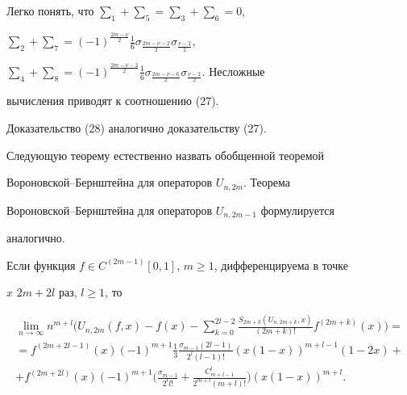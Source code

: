 \begin{pf}
Легко понять, что $\sum_1+\sum_5=\sum_3+\sum_6=0$, 


$\sum_2+\sum_7=(-1)^{\frac{2m-\nu}{2}}\frac{1}{6} 


\sigma_{\frac{2m-\nu-2}{2}}\sigma_{\frac{\nu-2}{2}}$, 


$\sum_4+\sum_8=(-1)^{\frac{2m-\nu-2}{2}}\frac{1}{6} 


\sigma_{\frac{2m-\nu-6}{2}}\sigma_{\frac{\nu-2}{2}}$. Несложные 


вычисления приводят к соотношению (27). 


 


Доказательство (28) аналогично доказательству (27). 


\end{pf} 


 


Следующую теорему естественно назвать обобщенной теоремой 


Вороновской--Бернштейна для операторов $U_{n,2m}$. Теорема 


Вороновской--Бернштейна для операторов $U_{n,2m-1}$ формулируется 


аналогично. 


 


\begin{thm} 


Если функция $f\in C^{(2m-1)}[0,1]$, $m\ge1$, дифференцируема в точке 


$x$\; $2m+2l$ раз, $l\ge1$, то 


\begin{multline*} 


\lim_{n\to\infty}n^{m+l}\bigg(U_{n,2m}(f,x)-f(x)- 


\sum^{2l-2}_{k=0}\frac{S_{2m+k}(U_{n,2m+k},x)}{(2m+k)!} 


f^{(2m+k)}(x)\bigg)= \\ 


% 


=f^{(2m+2l-1)}(x)(-1)^{m+1}\frac{1}{3} 


\frac{\sigma_{m-1}(2l-1)}{2^l(l-1)!}(x(1-x))^{m+l-1}(1-2x)+\\ 


% 


+f^{(2m+2l)}(x)(-1)^{m+1}\bigg( 


\frac{\sigma_{m-1}}{2^l l!}+\frac{C^l_{m+l-1}}{2^{m+l}(m+l)!}\bigg)


(x(1-x))^{m+l}.


\end{multline*} 


\end{thm} 



